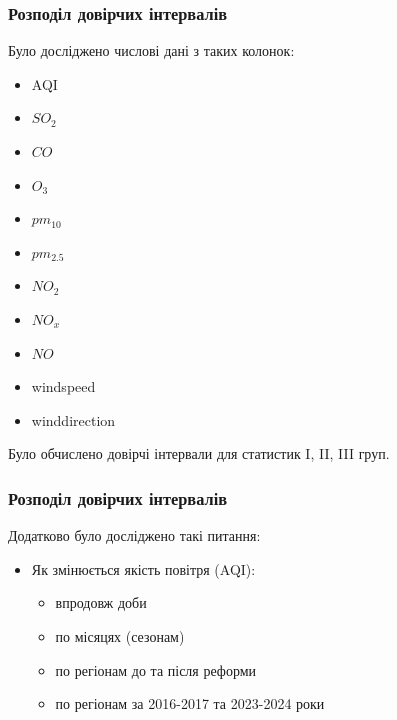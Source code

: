 \documentclass{beamer}
\begin{document}
\begin{frame}
  \frametitle{Розподіл довірчих інтервалів}
  Було досліджено числові дані з таких колонок:
  \begin{multicols}{2}
    \begin{itemize}
        \item AQI
        \item $SO_2$
        \item $CO$
        \item $O_3$
        \item $pm_{10}$
        \item $pm_{2.5}$
        \item $NO_2$
        \item $NO_x$
        \item $NO$
        \item windspeed
        \item winddirection
    \end{itemize}
    \end{multicols} 
  Було обчислено довірчі інтервали для статистик I, II, III груп.
\end{frame}  

\begin{frame}
  \frametitle{Розподіл довірчих інтервалів}
  Додатково було досліджено такі питання:
  \begin{itemize}
    \item Як змінюється якість повітря (AQI): 
    \begin{itemize}
        \item впродовж доби
        \item по місяцях (сезонам)
        \item по регіонам до та після реформи
        \item по регіонам за 2016-2017 та 2023-2024 роки
    \end{itemize}
  \end{itemize}
  
\end{frame}
\end{document}
